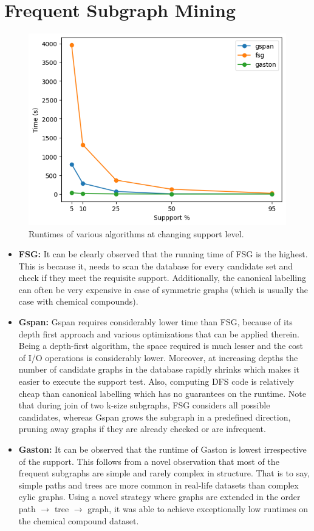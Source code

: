 \documentclass[hidelinks,12pt]{article}
\begin{document}
\section{Frequent Subgraph Mining}
\begin{figure}[H]
  \centering
  \includegraphics[width=\textwidth]{1.png}
  \caption{Runtimes of various algorithms at changing support level.}
\end{figure}

\begin{itemize}
  \item \textbf{FSG:} It can be clearly observed that the running time of FSG is the highest. This is because it, needs to scan the database for every candidate set and check if they meet the requisite support. Additionally, the canonical labelling can often be very expensive in case of symmetric graphs (which is usually the case with chemical compounds).
  \item \textbf{Gspan:} Gspan requires considerably lower time than FSG, because of its depth first approach and various optimizations that can be applied therein. Being a depth-first algorithm, the space required is much lesser and the cost of I/O operations is considerably lower. Moreover, at increasing depths the number of candidate graphs in the database rapidly shrinks which makes it easier to execute the support test. Also, computing DFS code is relatively cheap than canonical labelling which has no guarantees on the runtime. Note that during join of two k-size subgraphs, FSG considers all possible candidates, whereas Gspan grows the subgraph in a predefined direction, pruning away graphs if they are already checked or are infrequent.
  \item \textbf{Gaston:} It can be observed that the runtime of Gaston is lowest irrespective of the support. This follows from a novel observation that most of the frequent subgraphs are simple and rarely complex in structure. That is to say, simple paths and trees are more common in real-life datasets than complex cylic graphs. Using a novel strategy where graphs are extended in the order path $\rightarrow $ tree $\rightarrow $ graph, it was able to achieve exceptionally low runtimes on the chemical compound dataset.
\end{itemize}
\end{document}
